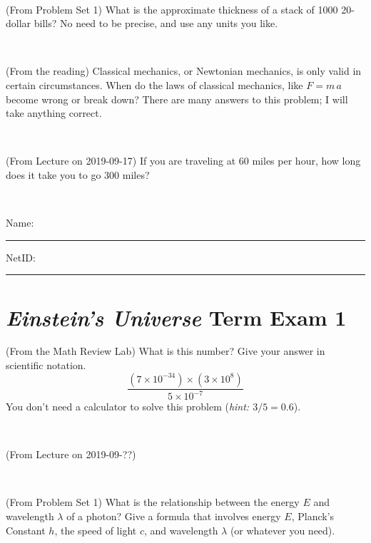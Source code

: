 \documentclass[12pt, letterpaper]{article}
\begin{document}
\vfill ~

\begin{problem} (From Problem Set 1)
What is the approximate thickness of a stack of 1000 20-dollar bills?
No need to be precise, and use any units you like.
\end{problem}


\vfill ~

\begin{problem} (From the reading)
Classical mechanics, or Newtonian mechanics, is only valid in certain
circumstances. When do the laws of classical mechanics, like $F =
m\,a$ become wrong or break down? There are many answers to this
problem; I will take anything correct.
\end{problem}


\vfill ~

\begin{problem} (From Lecture on 2019-09-17)
If you are traveling at 60 miles per hour, how long does
it take you to go 300 miles?
\end{problem}


\vfill ~


\cleardoublepage



\noindent
Name: \rule[-1ex]{0.60\textwidth}{0.1pt}
NetID: \rule[-1ex]{0.20\textwidth}{0.1pt}

\section*{\textsl{Einstein's Universe} Term Exam 1}
\setcounter{problem}{1}


\begin{problem} (From the Math Review Lab)
What is this number? Give your answer in scientific notation.
$$
\frac{(7\times10^{-34})\times(3\times10^8)}{5\times10^{-7}}
$$
You don't need a calculator to solve this problem (\textit{hint: $3/5=0.6$}).
\end{problem}


\vfill ~

\begin{problem} (From Lecture on 2019-09-??)
\end{problem}


\vfill ~

\begin{problem} (From Problem Set 1)
What is the relationship between the energy $E$ and wavelength
$\lambda$ of a photon? Give a formula that involves energy $E$,
Planck's Constant $h$, the speed of light $c$, and wavelength
$\lambda$ (or whatever you need).
\end{problem}
\end{document}
